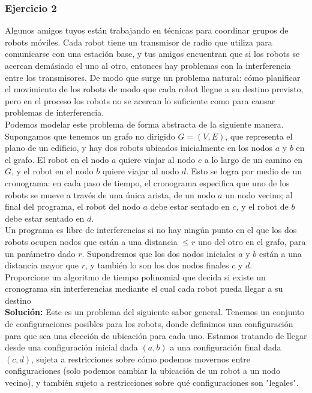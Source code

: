 \documentclass[a4paper, 12pt]{book}
\theoremstyle{dotless}
\begin{document}
\subsubsection*{Ejercicio 2}

Algunos amigos tuyos están trabajando en técnicas para coordinar grupos de robots móviles. Cada robot tiene un transmisor de radio que utiliza para comunicarse con una estación base, y tus amigos encuentran que si los robots se acercan demásiado el uno al otro, entonces hay problemas con la interferencia entre los transmisores. De modo que surge un problema natural: cómo planificar el movimiento de los robots de modo que cada robot llegue a su destino previsto, pero en el proceso los robots no se acercan lo suficiente como para causar problemas de interferencia.\\

Podemos modelar este problema de forma abstracta de la siguiente manera. Supongamos que tenemos un grafo no dirigido $G =(V, E)$, que representa el plano de un edificio, y hay dos robots ubicados inicialmente en los nodos $a$ y $b$ en el grafo. El robot en el nodo $a$ quiere viajar al nodo $c$ a lo largo de un camino en $G$, y el robot en el nodo $b$ quiere viajar al nodo $d$. Esto se logra por medio de un cronograma: en cada paso de tiempo, el cronograma especifica que uno de los robots se mueve a través de una única arista, de un nodo $a$ un nodo vecino; al final del programa, el robot del nodo $a$ debe estar sentado en $c$, y el robot de $b$ debe estar sentado en $d$.\\

Un programa es libre de interferencias si no hay ningún punto en el que los dos robots ocupen nodos que están a una distancia $≤ r$ uno del otro en el grafo, para un parámetro dado $r$. Supondremos que los dos nodos iniciales $a$ y $b$ están a una distancia mayor que $r$, y también lo son los dos nodos finales $c$ y $d$.\\

Proporcione un algoritmo de tiempo polinomial que decida si existe un cronograma sin interferencias mediante el cual cada robot pueda llegar a su destino\\

\textbf{Solución:} Este es un problema del siguiente sabor general. Tenemos un conjunto de configuraciones posibles para los robots, donde definimos una configuración para que sea una elección de ubicación para cada uno. Estamos tratando de llegar desde una configuración inicial dada $(a,b)$ a una configuración final dada $(c,d)$, sujeta a restricciones sobre cómo podemos movernos entre configuraciones (solo podemos cambiar la ubicación de un robot a un nodo vecino), y también sujeto a restricciones sobre qué configuraciones son "legales".\\
\end{document}
